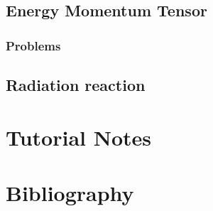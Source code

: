    \chapter{Energy Momentum Tensor}
      
      
      
      \section{Problems}
         
         
         
         

   \chapter{Radiation reaction}
      
      
      
      
   
\part{Tutorial Notes}
   

\part{Bibliography}
